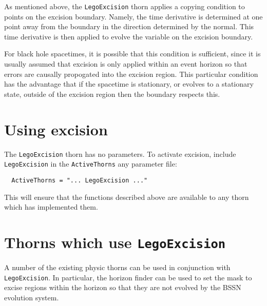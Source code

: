 \documentclass{article}
\begin{document}
As mentioned above, the \texttt{LegoExcision} thorn applies a copying
condition to points on the excision boundary. Namely, the time
derivative is determined at one point away from the boundary in the
direction determined by the normal. This time derivative is then
applied to evolve the variable on the excision boundary.

For black hole spacetimes, it is possible that this condition is
sufficient, since it is usually assumed that excision is only applied
within an event horizon so that errors are causally propogated into
the excision region. This particular condition has the advantage that
if the spacetime is stationary, or evolves to a stationary state,
outside of the excision region then the boundary respects this.

\section{Using excision}

The \texttt{LegoExcision} thorn has no parameters. To activate
excision, include \texttt{LegoExcision} in the \texttt{ActiveThorns}
any parameter file:
\begin{verbatim}
  ActiveThorns = "... LegoExcision ..."
\end{verbatim}
This will ensure that the functions described above are available
to any thorn which has implemented them.

\section{Thorns which use \texttt{LegoExcision}}

A number of the existing physic thorns can be used in conjunction with
\texttt{LegoExcision}. In particular, the horizon finder can be used
to set the mask to excise regions within the horizon so that they are
not evolved by the BSSN evolution system.\\
\end{document}
